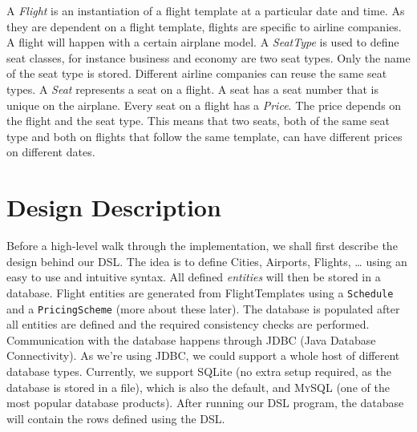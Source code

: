 \documentclass[a4paper]{article}
\newcommand{\cc}[1]{\texttt{#1}}
\newcommand{\field}[1]{\emph{#1}}
\begin{document}


A \field{Flight} is an instantiation of a flight template at a particular date and time.
As they are dependent on a flight template, flights are specific to airline companies.
A flight will happen with a certain airplane model.
A \field{SeatType} is used to define seat classes, for instance business and economy are two seat types.
Only the name of the seat type is stored.
Different airline companies can reuse the same seat types.
A \field{Seat} represents a seat on a flight.
A seat has a seat number that is unique on the airplane.
Every seat on a flight has a \field{Price}.
The price depends on the flight and the seat type.
This means that two seats, both of the same seat type and both on flights that follow the same template, can have different prices on different dates.


\clearpage
\section{Design Description}
\label{sec:design-description}



Before a high-level walk through the implementation, we shall first describe the design behind our DSL.
The idea is to define Cities, Airports, Flights, \ldots{} using an easy to use and intuitive syntax.
All defined \emph{entities} will then be stored in a database.
Flight entities are generated from FlightTemplates using a \cc{Schedule} and a \cc{Pricing\-Scheme} (more about these later).
The database is populated after all entities are defined and the required consistency checks are performed.
Communication with the database happens through \textsc{JDBC} (Java Database Connectivity).
As we're using \textsc{JDBC}, we could support a whole host of different database types.
Currently, we support SQLite (no extra setup required, as the database is stored in a file), which is also the default, and \textsc{MySQL} (one of the most popular database products).
After running our DSL program, the database will contain the rows defined using the DSL\@.
\end{document}
